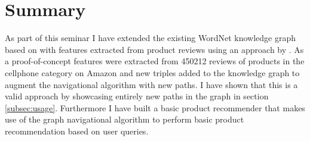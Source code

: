 \section{Summary}
As part of this seminar I have extended the existing WordNet knowledge graph based on \cite{silva2018recognizing} with features extracted from product reviews using an approach by \cite{scaffidi2007red}. As a
proof-of-concept features were extracted from 450212 reviews of products in the cellphone category
on Amazon and new triples added to the knowledge graph to augment the navigational
algorithm with new paths. I have shown that this is a valid approach by showcasing entirely new
paths in the graph in section \ref{subsec:usage}.
Furthermore I have built a basic product recommender that makes use of the graph navigational
algorithm to perform basic product recommendation based on user queries.


\endgroup